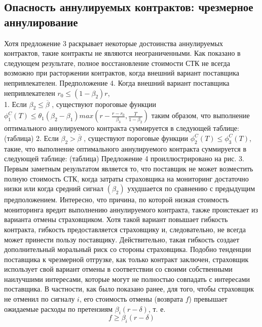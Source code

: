 \documentclass[a4paper,12pt]{article}
\begin{document}
\subsection{Опасность аннулируемых контрактов: чрезмерное аннулирование}
Хотя предложение 3 раскрывает некоторые достоинства аннулируемых контрактов, такие контракты не являются неограниченными. Как показано в следующем результате, полное восстановление стоимости СТК не всегда возможно при расторжении контрактов, когда внешний вариант поставщика непривлекателен.
Предположение 4. Когда внешний вариант поставщика непривлекателен $r_{0} \leq (1-\beta_{2})r$,
\\
1. Если $\beta_{2} \leq \overline{\beta}$ , существуют пороговые функции
$\phi_{1}^{C}(T) \leq \theta_{1}(\beta_{2} - \beta_{1})max(r - \frac{r-r_{0}}{\beta_{3}}, \frac{T}{1-\beta_{2}})$ таким образом, что выполнение оптимального аннулируемого контракта суммируется в следующей таблице:
(таблица)
2. Если $\beta_{2} > \overline{\beta}$ , существуют пороговые функции $\phi_{2}^{C}(T) \leq \phi_{3}^{C}(T)$, такие, что выполнение
оптимального аннулируемого контракта суммируется в следующей таблице:
(таблица)
Предложение 4 проиллюстрировано на рис. 3. Первым заметным результатом является то, что поставщик не может возместить полную стоимость СТК, когда затраты страховщика на мониторинг достаточно низки или когда средний сигнал $(\beta_{2})$ ухудшается по сравнению с предыдущим предположением.
Интересно, что причина, по которой низкая стоимость мониторинга вредит выполнению аннулируемого контракта, также проистекает из варианта отмены страховщиком. Хотя такой вариант повышает гибкость контракта, гибкость предоставляется страховщику и, следовательно, не всегда может принести пользу поставщику. Действительно, такая гибкость создает дополнительный моральный риск со стороны страховщика. Подобно тенденции поставщика к чрезмерной отгрузке, как только контракт заключен, страховщик использует свой вариант отмены в соответствии со своими собственными наилучшими интересами, которые могут не полностью совпадать с интересами поставщика. В частности, как было показано ранее, для того, чтобы страховщик не отменил по сигналу $i$, его стоимость отмены (возврата $f$) превышает ожидаемые расходы по претензиям $\beta_{i}(r - \delta)$, т. е.
\begin{equation}
	f \geq \beta_{i}(r - \delta)
\end{equation}
\end{document}
